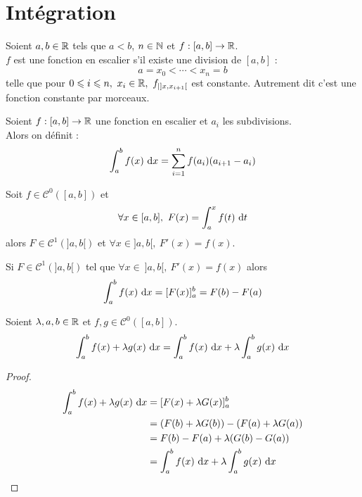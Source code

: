 \chapter{Intégration}
\def\arraystretch{1}

\begin{definition}
	Soient $a, b \in \mathbb{R}$ tels que $a < b$, $n \in \mathbb{N}$ et $f : [a, b] \to \mathbb{R}$.
	\\
	$f$ est une fonction en escalier s'il existe une division de $[a, b]$ :
	\[ a = x_0 < \cdots < x_n = b \]
	telle que pour $0 \leqslant i \leqslant n,\ x_i \in \mathbb{R},\  f_{| ]x, x_{i+1}[}$ est constante.
	Autrement dit c'est une fonction constante par morceaux.
\end{definition}

\begin{definition}
	Soient $f : [a, b] \to \mathbb{R}$ une fonction en escalier et $a_i$ les subdivisions.
	\\
	Alors on définit :
	\[ \int_{a}^{b} f(x) \ \diffd x = \sum_{i = 1}^{n} f(a_i) (a_{i+1} - a_i) \]
\end{definition}

\begin{theorem}
	Soit $f \in \mathcal{C}^0([a, b])$ et 
	\begin{align*}
		\forall x \in [a, b],\ F(x) = \int_a^x f(t) \ \diffd t
	\end{align*}
	alors $F \in \mathcal{C}^1(]a, b[)$ et $\forall x \in ]a, b[,\ F'(x) = f(x)$.    
\end{theorem}

\begin{corollary}
    Si $F \in \mathcal{C}^1(]a, b[)$ tel que $\forall x \in \ ]a, b[,\ F'(x) = f(x)$ alors
	\begin{align*}
		\int_a^b f(x) \ \diffd x = [F(x)]_a^b = F(b) - F(a) 
	\end{align*}
\end{corollary}

\begin{proposition}
	Soient $\lambda, a, b \in \mathbb{R}$ et $f, g \in \mathcal{C}^0([a, b])$.
	\begin{align*}
		\int_a^b f(x) + \lambda g(x) \ \diffd x = \int_a^b f(x) \ \diffd x + \lambda \int_a^b g(x) \ \diffd x 
	\end{align*}
\end{proposition}

\begin{proof}
    \begin{align*}
        \int_{a}^{b} f(x) + \lambda g(x) \ \diffd x &= [F(x) + \lambda G(x)]_a^b \\
                                                    &= (F(b) + \lambda G(b)) - (F(a) + \lambda G(a)) \\
                                                    &= F(b) - F(a) + \lambda (G(b) - G(a)) \\
                                                    &= \int_{a}^{b} f(x) \ \diffd x + \lambda \int_{a}^{b} g(x) \ \diffd x
    \end{align*}
\end{proof}

